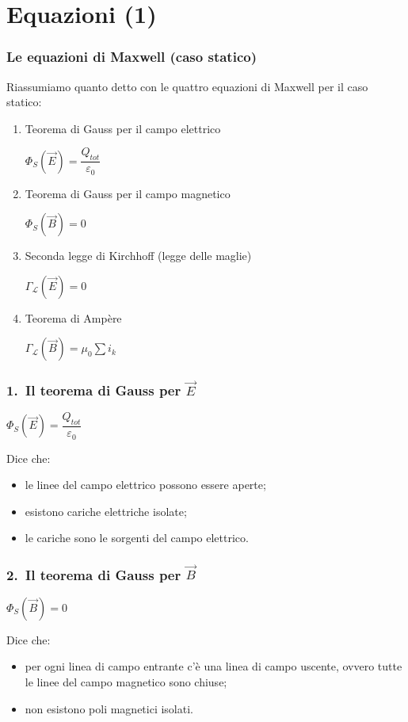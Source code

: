 \documentclass[]{beamer}
\theoremstyle{plain}
\begin{document}
\section{Equazioni (1)}

\begin{frame}
\frametitle{Le equazioni di Maxwell (caso statico)}
  Riassumiamo quanto detto con le \alert{quattro equazioni di Maxwell} per il caso statico:\pause
\begin{enumerate}
  \item Teorema di Gauss per il campo elettrico
  \begin{center}
  \colorbox{blue!30}{$ \Phi_S (\vec{E}) = \dfrac{Q_{tot}}{\varepsilon_0} $}
  \end{center}\pause
  \item Teorema di Gauss per il campo magnetico
  \begin{center}
  \colorbox{blue!30}{$ \Phi_S (\vec{B}) = 0 $}
  \end{center}\pause
  \item Seconda legge di Kirchhoff (legge delle maglie)
  \begin{center}
\colorbox{blue!30}{  $ \Gamma_\mathscr{L} (\vec{E}) = 0 $}
  \end{center}\pause
  \item Teorema di Ampère
  \begin{center}
  \colorbox{blue!30}{$ \Gamma_\mathscr{L} (\vec{B}) = \mu_0 \sum\limits i_k $}
  \end{center}
\end{enumerate}
\end{frame}

\begin{frame}
  \frametitle{1.~Il teorema di Gauss per $ \vec{E} $}
    \begin{center}
  \colorbox{blue!30}{$ \Phi_S (\vec{E}) = \dfrac{Q_{tot}}{\varepsilon_0} $}
  \end{center}\pause
  Dice che:
  \begin{itemize}
    \item le linee del campo elettrico possono essere aperte;\pause
    \item esistono cariche elettriche isolate;\pause
    \item le cariche sono le sorgenti del campo elettrico.
  \end{itemize}
\end{frame}

\begin{frame}
  \frametitle{2.~Il teorema di Gauss per $ \vec{B} $}
    \begin{center}
  \colorbox{blue!30}{$ \Phi_S (\vec{B}) = 0 $}
  \end{center}\pause
  Dice che:
  \begin{itemize}
    \item per ogni linea di campo entrante c'è una linea di campo uscente, ovvero tutte le linee del campo magnetico sono chiuse;\pause
    \item non esistono poli magnetici isolati.
  \end{itemize}
\end{frame}
\end{document}
